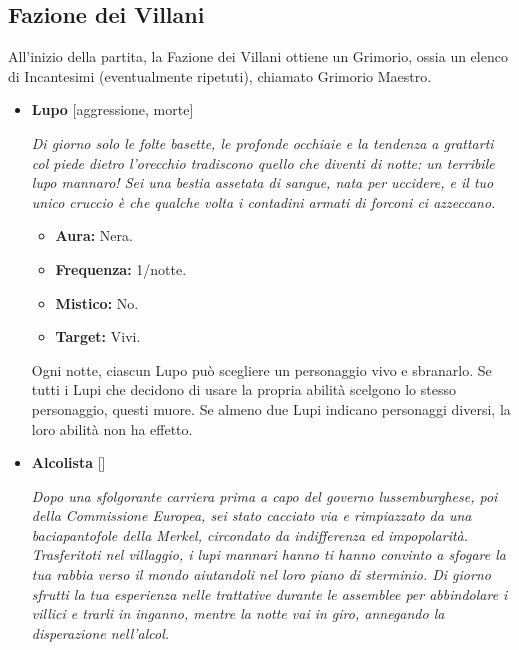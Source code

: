 \documentclass[a4paper,10pt]{article}
\begin{document}
\subsection*{Fazione dei Villani}

All'inizio della partita, la Fazione dei Villani ottiene un Grimorio, ossia un elenco di Incantesimi (eventualmente ripetuti), chiamato Grimorio Maestro.

\begin{itemize}

      \item \textbf{Lupo} [aggressione, morte]

            \emph{Di giorno solo le folte basette, le profonde occhiaie e la tendenza a grattarti col piede dietro l'orecchio tradiscono quello che diventi di notte: un terribile lupo mannaro! Sei una bestia assetata di sangue, nata per uccidere, e il tuo unico cruccio è che qualche volta i contadini armati di forconi ci azzeccano.}

            \begin{multicols}{2}
                  \begin{itemize}
                        \item \textbf{Aura:} Nera.
                        \item \textbf{Frequenza:} 1/notte.
                        \item \textbf{Mistico:} No.
                        \item \textbf{Target:} Vivi.
                  \end{itemize}
            \end{multicols}

            Ogni notte, ciascun Lupo può scegliere un personaggio vivo e sbranarlo. Se tutti i Lupi che decidono di usare la propria abilità scelgono lo stesso personaggio, questi muore. Se almeno due Lupi indicano personaggi diversi, la loro abilità non ha effetto.

      \item \textbf{Alcolista} []

            \emph{Dopo una sfolgorante carriera prima a capo del governo lussemburghese, poi della Commissione Europea, sei stato cacciato via e rimpiazzato da una baciapantofole della Merkel, circondato da indifferenza ed impopolarità. Trasferitoti nel villaggio, i lupi mannari hanno ti hanno convinto a sfogare la tua rabbia verso il mondo aiutandoli nel loro piano di sterminio. Di giorno sfrutti la tua esperienza nelle trattative durante le assemblee per abbindolare i villici e trarli in inganno, mentre la notte vai in giro, annegando la disperazione nell'alcol.}


\end{itemize}
\end{document}
